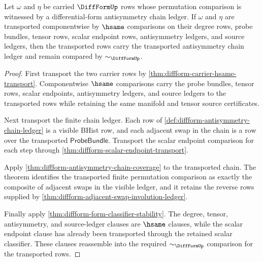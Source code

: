 \begin{theorem}
\label{thm:diffform-antisymmetry-chain-classifier-stability}
Let $\omega$ and $\eta$ be carried $\DiffFormUp$ rows whose permutation
comparison is witnessed by a differential-form antisymmetry chain ledger. If
$\omega$ and $\eta$ are transported componentwise by $\hsame$ comparisons on
their degree rows, probe bundles, tensor rows, scalar endpoint rows,
antisymmetry ledgers, and source ledgers, then the transported rows carry the
transported antisymmetry chain ledger and remain compared by
$\sim_{\DiffFormUp}$.
\end{theorem}
\begin{proof}
First transport the two carrier rows by
\autoref{thm:diffform-carrier-hsame-transport}. Componentwise $\hsame$
comparisons carry the probe bundles, tensor rows, scalar endpoints,
antisymmetry ledgers, and source ledgers to the transported rows while
retaining the same manifold and tensor source certificates.

Next transport the finite chain ledger. Each row of
\autoref{def:diffform-antisymmetry-chain-ledger} is a visible BHist row, and
each adjacent swap in the chain is a row over the transported
$\mathsf{ProbeBundle}$. Transport the scalar endpoint comparison for each
step through \autoref{thm:diffform-scalar-endpoint-transport}.

Apply \autoref{thm:diffform-antisymmetry-chain-coverage} to the transported
chain. The theorem identifies the transported finite permutation comparison
as exactly the composite of adjacent swaps in the visible ledger, and it
retains the reverse rows supplied by
\autoref{thm:diffform-adjacent-swap-involution-ledger}.

Finally apply \autoref{thm:diffform-form-classifier-stability}. The degree,
tensor, antisymmetry, and source-ledger clauses are $\hsame$ clauses, while
the scalar endpoint clause has already been transported through the retained
scalar classifier. These clauses reassemble into the required
$\sim_{\DiffFormUp}$ comparison for the transported rows.
\end{proof}

